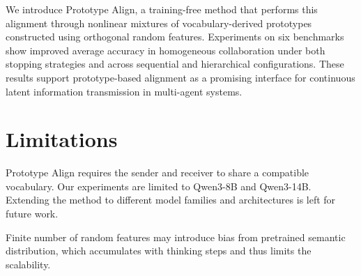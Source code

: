 \documentclass[11pt]{article}
\newcommand{\xiyan}[1]{\textcolor{table_green}{#1}}
\newcommand{\mingzhe}[1]{\textcolor{table_red}{#1}}
\begin{document}
We introduce Prototype Align, a training-free method that performs this alignment through nonlinear mixtures of vocabulary-derived prototypes constructed using orthogonal random features. Experiments on six benchmarks show improved average accuracy in homogeneous collaboration under both stopping strategies and across sequential and hierarchical configurations. These results support prototype-based alignment as a promising interface for continuous latent information transmission in multi-agent systems.

\section*{Limitations}
Prototype Align requires the sender and receiver to share a compatible vocabulary. Our experiments are limited to Qwen3-8B and Qwen3-14B. Extending the method to different model families and architectures is left for future work.


Finite number of random features may introduce bias from pretrained semantic distribution, which accumulates with thinking steps and thus limits the scalability. 

\end{document}
